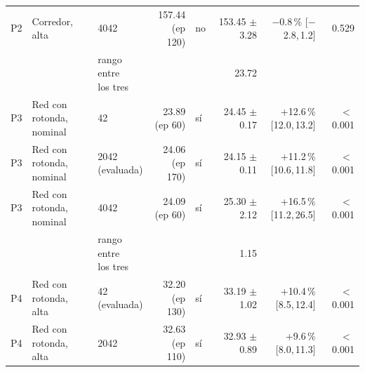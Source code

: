 \begin{table}[H]
\begin{tabular}{lllrlrrr}
P2 & \makecell[l]{Corredor,\\{}alta} & 4042 & \makecell[r]{157.44\\{}(ep 120)} & no & \makecell[r]{153.45\\{}$\pm$ 3.28} & \makecell[r]{$-$0.8\,\%\\{}[$-$2.8,\,1.2]} & 0.529 \\
 & & \makecell[l]{rango entre\\{}los tres} & & & 23.72 & & \\
P3 & \makecell[l]{Red con rotonda,\\{}nominal} & 42 & \makecell[r]{23.89\\{}(ep 60)} & sí & \makecell[r]{24.45\\{}$\pm$ 0.17} & \makecell[r]{+12.6\,\%\\{}[12.0,\,13.2]} & $<$\,0.001 \\
P3 & \makecell[l]{Red con rotonda,\\{}nominal} & \makecell[l]{2042\\{}(evaluada)} & \makecell[r]{24.06\\{}(ep 170)} & sí & \makecell[r]{24.15\\{}$\pm$ 0.11} & \makecell[r]{+11.2\,\%\\{}[10.6,\,11.8]} & $<$\,0.001 \\
P3 & \makecell[l]{Red con rotonda,\\{}nominal} & 4042 & \makecell[r]{24.09\\{}(ep 60)} & sí & \makecell[r]{25.30\\{}$\pm$ 2.12} & \makecell[r]{+16.5\,\%\\{}[11.2,\,26.5]} & $<$\,0.001 \\
 & & \makecell[l]{rango entre\\{}los tres} & & & 1.15 & & \\
P4 & \makecell[l]{Red con rotonda,\\{}alta} & \makecell[l]{42\\{}(evaluada)} & \makecell[r]{32.20\\{}(ep 130)} & sí & \makecell[r]{33.19\\{}$\pm$ 1.02} & \makecell[r]{+10.4\,\%\\{}[8.5,\,12.4]} & $<$\,0.001 \\
P4 & \makecell[l]{Red con rotonda,\\{}alta} & 2042 & \makecell[r]{32.63\\{}(ep 110)} & sí & \makecell[r]{32.93\\{}$\pm$ 0.89} & \makecell[r]{+9.6\,\%\\{}[8.0,\,11.3]} & $<$\,0.001 \\

\end{tabular}
\end{table}
